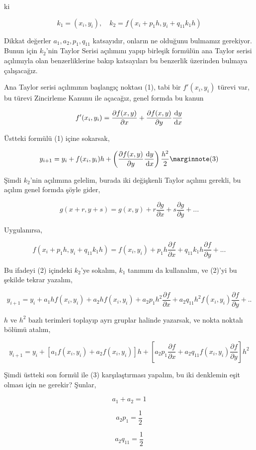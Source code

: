 \documentclass[12pt,fleqn]{article}\usepackage{../../common}
\begin{document}
ki

$$
k_1 = (x_i,y_i), \quad k_2 = f(x_i+p_1 h, y_i + q_{11}k_1h)
$$

Dikkat değerler $a_1,a_2,p_1,q_{11}$ katsayıdır, onların ne olduğunu bulmamız
gerekiyor. Bunun için $k_2$'nin Taylor Serisi açılımını yapıp birleşik formülün
ana Taylor serisi açılımıyla olan benzerliklerine bakıp katsayıları bu benzerlik
üzerinden bulmaya çalışacağız.

Ana Taylor serisi açılımının başlangıç noktası (1), tabi bir $f'(x_i,y_i)$
türevi var, bu türevi Zincirleme Kanunu ile açacağız, genel formda bu kanun

$$
f'(x_i,y_i) = \frac{\partial f(x,y)}{\partial x} +
\frac{\partial f(x,y)}{\partial y} \frac{\,\mathrm{d} y}{\,\mathrm{d} x}
$$

Üstteki formülü (1) içine sokarsak,

$$
y_{i+1} = y_i + f(x_i,y_i) h +
\left( \frac{\partial f(x,y)}{\partial y} \frac{\ud y}{\ud x}  \right) \frac{h^2}{2}
\mlabel{3}
$$

Şimdi $k_2$'nin açılımına gelelim, burada iki değişkenli Taylor açılımı gerekli,
bu açılım genel formda şöyle gider,

$$
g(x+r,y+s) = g(x,y) + r \frac{\partial g}{\partial x} + s \frac{\partial g}{\partial y} + ...
$$

Uygulanırsa,

$$
f(x_i+p_1 h, y_i + q_{11}k_1h) = f(x_i,y_i) +
p_1 h \frac{\partial f}{\partial x} +
q_{11} k_1 h \frac{\partial f}{\partial y} + ...
$$

Bu ifadeyi (2) içindeki $k_2$'ye sokalım, $k_1$ tanımını da kullanalım, ve
(2)'yi bu şekilde tekrar yazalım,

$$
y_{i+1} = y_i + a_1 h f(x_i,y_i) + a_2 h f(x_i,y_i) +
a_2 p_1 h^2 \frac{\partial f}{\partial x} +
a_2 q_{11} h^2 f(x_i,y_i) \frac{\partial f}{\partial y} + ..
$$

$h$ ve $h^2$ bazlı terimleri toplayıp ayrı gruplar halinde yazarsak, ve
nokta noktalı bölümü atalım,

$$
y_{i+1} = y_i + [a_1 f(x_i,y_i) + a_2 f(x_i,y_i)] h +
\left[a_2 p_1 \frac{\partial f}{\partial x} +
 a_2 q_{11} f(x_i,y_i) \frac{\partial f}{\partial y}
\right] h^2
$$

Şimdi üstteki son formül ile (3) karşılaştırması yapalım, bu iki denklemin eşit
olması için ne gerekir? Şunlar,

$$
a_1 + a_2 = 1
$$

$$
a_2 p_1 = \frac{1}{2}
$$

$$
a_2 q_{11} = \frac{1}{2}
$$
\end{document}
